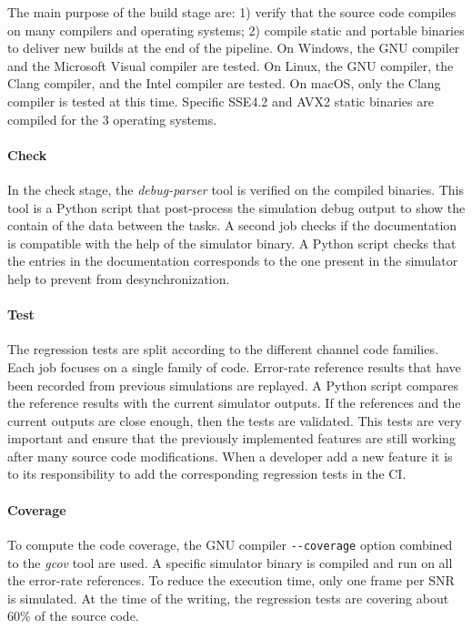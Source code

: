 The main purpose of the build stage are: 1) verify that the \AFFECT source code
compiles on many compilers and operating systems; 2) compile static and portable
binaries to deliver new builds at the end of the pipeline. On Windows, the GNU
compiler and the Microsoft Visual compiler are tested. On Linux, the GNU
compiler, the Clang compiler, and the Intel compiler are  tested. On macOS, only
the Clang compiler is tested at this time. Specific SSE4.2 and AVX2 static
binaries are compiled for the 3 operating systems.

\paragraph{Check}

In the check stage, the \emph{debug-parser} tool is verified on the compiled
\AFFECT binaries. This tool is a Python script that post-process the \AFFECT
simulation debug output to show the contain of the data between the tasks. A
second job checks if the documentation is compatible with the help of the
\AFFECT simulator binary. A Python script checks that the entries in the
documentation corresponds to the one present in the simulator help to prevent
from desynchronization.

\paragraph{Test}

The regression tests are split according to the different channel code families.
Each job focuses on a single family of code. Error-rate reference results that
have been recorded from previous simulations are replayed. A Python script
compares the reference results with the current simulator outputs. If the
references and the current outputs are close enough, then the tests are
validated. This tests are very important and ensure that the previously
implemented features are still working after many source code modifications.
When a developer add a new feature it is to its responsibility to add the
corresponding regression tests in the CI.

\paragraph{Coverage}

To compute the code coverage, the GNU compiler \verb|--coverage| option combined
to the \emph{gcov} tool are used. A specific \AFFECT simulator binary is
compiled and run on all the error-rate references. To reduce the execution time,
only one frame per SNR is simulated. At the time of the writing, the regression
tests are covering about 60\% of the \AFFECT source code.

